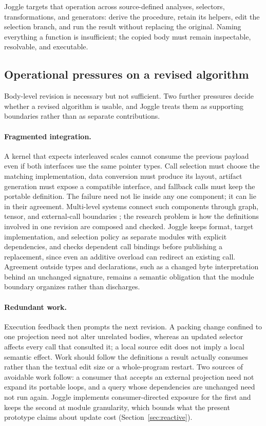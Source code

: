 \documentclass[sigplan,anonymous,review]{acmart}
\begin{document}
Joggle targets that operation across source-defined analyses, selectors,
transformations, and generators: derive the procedure, retain its helpers,
edit the selection branch, and run the result without replacing the original.
Naming everything a function is insufficient; the copied body must remain
inspectable, resolvable, and executable.

\subsection{Operational pressures on a revised algorithm}
Body-level revision is necessary but not sufficient. Two further pressures
decide whether a revised algorithm is usable, and Joggle treats them as
supporting boundaries rather than as separate contributions.

\paragraph{Fragmented integration.}
A kernel that expects interleaved scales cannot consume the previous payload
even if both interfaces use the same pointer types. Call selection must choose
the matching implementation, data conversion must produce its layout, artifact
generation must expose a compatible interface, and fallback calls must keep
the portable definition. The failure need not lie inside any one component;
it can lie in their agreement. Multi-level systems connect such components
through graph, tensor, and external-call boundaries
\cite{lai2025relax,tvmArchitectureDocs,jin2020onnxmlir,onnxmlirDocs}; the
research problem is how the definitions involved in one revision are composed
and checked. Joggle keeps format, target implementation, and selection policy
as separate modules with explicit dependencies, and checks dependent call
bindings before publishing a replacement, since even an additive overload can
redirect an existing call. Agreement outside types and declarations, such as
a changed byte interpretation behind an unchanged signature, remains a
semantic obligation that the module boundary organizes rather than discharges.

\paragraph{Redundant work.}
Execution feedback then prompts the next revision. A packing change confined
to one projection need not alter unrelated bodies, whereas an updated selector
affects every call that consulted it; a local source edit does not imply a
local semantic effect. Work should follow the definitions a result actually
consumes rather than the textual edit size or a whole-program restart. Two
sources of avoidable work follow: a consumer that accepts an external
projection need not expand its portable loops, and a query whose dependencies
are unchanged need not run again. Joggle implements consumer-directed exposure
for the first and keeps the second at module granularity, which bounds what the
present prototype claims about update cost (Section~\ref{sec:reactive}).
\end{document}
